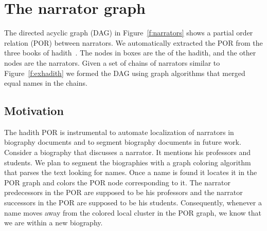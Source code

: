 \documentclass[11pt]{article}
\begin{document}
\section{The narrator graph}
\label{sec:graph}

\begin{figure}[tb]
\end{figure}

The directed acyclic graph (DAG) 
in Figure~\ref{f:narrators} shows a partial order 
relation (POR) between narrators.
We automatically extracted the POR from the three books of 
hadith~\cite{IbnHanbal,AlKulayni,AlTousi}.
The nodes in boxes are the  of the hadith, 
and the other nodes are the narrators.
Given a set of chains of narrators similar to 
Figure~\ref{f:exhadith} we formed the DAG using graph algorithms 
that merged equal names in the chains. 

\subsection{Motivation}

The hadith POR is instrumental to automate
localization of narrators in biography documents and
to segment biography documents in future work.
Consider a biography that discusses a narrator.
It mentions his professors and students.
We plan to segment the biographies with a graph 
coloring algorithm
that parses the text looking for names. 
Once a name is found it locates it in the POR graph
and colors the POR node corresponding
to it.
The narrator predecessors in the POR are supposed to be
his professors and the narrator successors in the POR 
are supposed to be his students. 
Consequently, whenever a name moves away from the 
colored local cluster in the POR graph, 
we know that we are within a new biography. 
\end{document}
